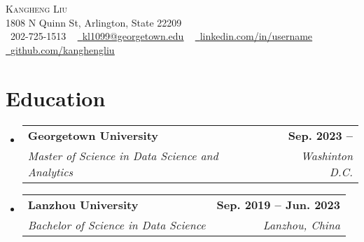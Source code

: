 \documentclass[letterpaper,11pt]{article}
\makeatletter
\newcommand{\resumeSubheading}[4]{
  \vspace{-2pt}\item
    \begin{tabular*}{1.0\textwidth}[t]{l@{\extracolsep{\fill}}r}
      \textbf{#1} & \textbf{\small #2} \\
      \textit{\small#3} & \textit{\small #4} \\
    \end{tabular*}\vspace{-7pt}
}
\newcommand{\resumeSubHeadingListStart}{\begin{itemize}[leftmargin=0.0in, label={}]}
\newcommand{\resumeSubHeadingListEnd}{\end{itemize}}
\makeatother
\begin{document}

\begin{center}
    {\Huge \scshape Kangheng Liu} \\ \vspace{1pt}
    1808 N Quinn St, Arlington, State 22209 \\ \vspace{1pt}
    \small \raisebox{-0.1\height}\faPhone\ 202-725-1513 ~ \href{mailto:kl1099@georgetown.edu}{\raisebox{-0.2\height}\faEnvelope\  \underline{kl1099@georgetown.edu}} ~ 
    \href{https://linkedin.com/in//}{\raisebox{-0.2\height}\faLinkedin\ \underline{linkedin.com/in/username}}  ~
    \href{https://github.com/kanghengliu}{\raisebox{-0.2\height}\faGithub\ \underline{github.com/kanghengliu}}
    \vspace{-8pt}
\end{center}


\section{Education}
  \resumeSubHeadingListStart
    \resumeSubheading
      {Georgetown University}{Sep. 2023 --}
      {Master of Science in Data Science and Analytics}{Washinton D.C.}
    \resumeSubheading
      {Lanzhou University}{Sep. 2019 -- Jun. 2023}
      {Bachelor of Science in Data Science}{Lanzhou, China}
  \resumeSubHeadingListEnd
\end{document}
